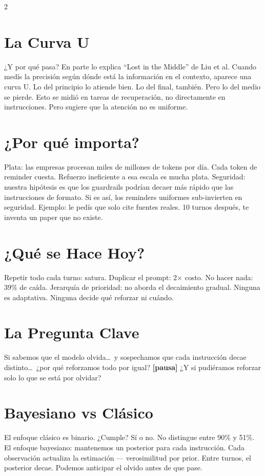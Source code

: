 \documentclass[10pt]{article}
\begin{document}
\begin{multicols}{2}
\section{La Curva U}
¿Y por qu\'e pasa? En parte lo explica ``Lost in the Middle'' de Liu et al. Cuando med\'is la precisi\'on seg\'un d\'onde est\'a la informaci\'on en el contexto, aparece una curva U. Lo del principio lo atiende bien. Lo del final, tambi\'en. Pero lo del medio se pierde. Esto se midi\'o en tareas de recuperaci\'on, no directamente en instrucciones. Pero sugiere que la atenci\'on no es uniforme.

\section{¿Por qu\'e importa?}
Plata: las empresas procesan miles de millones de tokens por d\'ia. Cada token de reminder cuesta. Refuerzo ineficiente a esa escala es mucha plata. Seguridad: nuestra hip\'otesis es que los guardrails podr\'ian decaer m\'as r\'apido que las instrucciones de formato. Si es as\'i, los reminders uniformes sub-invierten en seguridad. Ejemplo: le ped\'is que solo cite fuentes reales. 10 turnos despu\'es, te inventa un paper que no existe.

\section{¿Qu\'e se Hace Hoy?}
Repetir todo cada turno: satura. Duplicar el prompt: 2$\times$ costo. No hacer nada: 39\% de ca\'ida. Jerarqu\'ia de prioridad: no aborda el decaimiento gradual. Ninguna es adaptativa. Ninguna decide qu\'e reforzar ni cu\'ando.

\section{La Pregunta Clave}
Si sabemos que el modelo olvida\ldots\ y sospechamos que cada instrucci\'on decae distinto\ldots\ ¿por qu\'e reforzamos todo por igual? \textbf{[pausa]} ¿Y si pudi\'eramos reforzar solo lo que se est\'a por olvidar?

\section{Bayesiano vs Cl\'asico}
El enfoque cl\'asico es binario. ¿Cumple? S\'i o no. No distingue entre 90\% y 51\%. El enfoque bayesiano: mantenemos un posterior para cada instrucci\'on. Cada observaci\'on actualiza la estimaci\'on --- verosimilitud por prior. Entre turnos, el posterior decae. Podemos anticipar el olvido antes de que pase.


\end{multicols}
\end{document}

